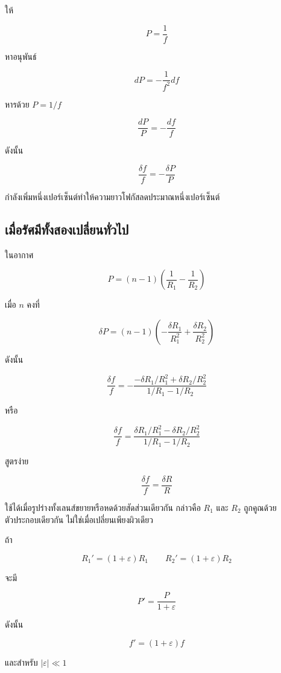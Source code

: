 ให้

\[
P=\frac{1}{f}
\]

หาอนุพันธ์

\[
dP=-\frac{1}{f^2}df
\]

หารด้วย $P=1/f$

\[
\frac{dP}{P}=-\frac{df}{f}
\]

ดังนั้น

\begin{tcolorbox}[title={ความสัมพันธ์ทั่วไปของการเปลี่ยนแปลงเล็กน้อย}]
\[
\boxed{\frac{\delta f}{f}=-\frac{\delta P}{P}}
\]
\end{tcolorbox}

กำลังเพิ่มหนึ่งเปอร์เซ็นต์ทำให้ความยาวโฟกัสลดประมาณหนึ่งเปอร์เซ็นต์

\subsection{เมื่อรัศมีทั้งสองเปลี่ยนทั่วไป}

ในอากาศ

\[
P=(n-1)
\left(
\frac{1}{R_1}-\frac{1}{R_2}
\right)
\]

เมื่อ $n$ คงที่

\[
\delta P
=(n-1)
\left(
-\frac{\delta R_1}{R_1^2}
+
\frac{\delta R_2}{R_2^2}
\right)
\]

ดังนั้น

\[
\frac{\delta f}{f}
=-
\frac{
-\delta R_1/R_1^2+\delta R_2/R_2^2
}{
1/R_1-1/R_2
}
\]

หรือ

\begin{tcolorbox}[title={รัศมีสองผิวเปลี่ยนอย่างอิสระ}]
\[
\boxed{
\frac{\delta f}{f}
=
\frac{
\delta R_1/R_1^2-\delta R_2/R_2^2
}{
1/R_1-1/R_2
}}
\]
\end{tcolorbox}

สูตรง่าย

\[
\frac{\delta f}{f}=\frac{\delta R}{R}
\]

ใช้ได้เมื่อรูปร่างทั้งเลนส์ขยายหรือหดด้วยสัดส่วนเดียวกัน กล่าวคือ $R_1$ และ $R_2$ ถูกคูณด้วยตัวประกอบเดียวกัน ไม่ใช่เมื่อเปลี่ยนเพียงผิวเดียว

ถ้า

\[
R_1'=(1+\varepsilon)R_1
\qquad
R_2'=(1+\varepsilon)R_2
\]

จะมี

\[
P'=\frac{P}{1+\varepsilon}
\]

ดังนั้น

\[
f'=(1+\varepsilon)f
\]

และสำหรับ $|\varepsilon|\ll1$

